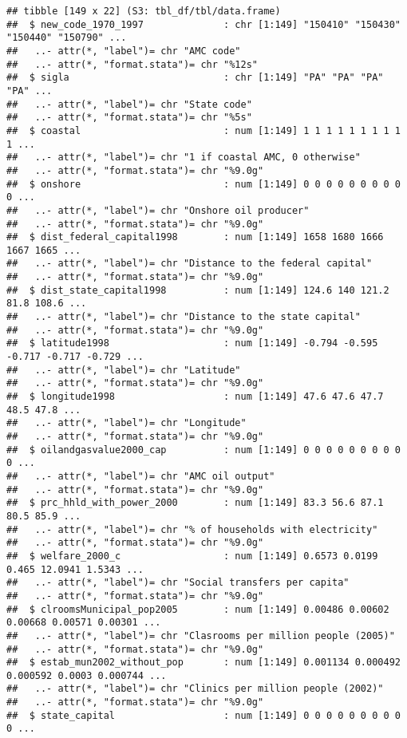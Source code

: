 \documentclass[
]{article}
\begin{document}
\begin{verbatim}
## tibble [149 x 22] (S3: tbl_df/tbl/data.frame)
##  $ new_code_1970_1997              : chr [1:149] "150410" "150430" "150440" "150790" ...
##   ..- attr(*, "label")= chr "AMC code"
##   ..- attr(*, "format.stata")= chr "%12s"
##  $ sigla                           : chr [1:149] "PA" "PA" "PA" "PA" ...
##   ..- attr(*, "label")= chr "State code"
##   ..- attr(*, "format.stata")= chr "%5s"
##  $ coastal                         : num [1:149] 1 1 1 1 1 1 1 1 1 1 ...
##   ..- attr(*, "label")= chr "1 if coastal AMC, 0 otherwise"
##   ..- attr(*, "format.stata")= chr "%9.0g"
##  $ onshore                         : num [1:149] 0 0 0 0 0 0 0 0 0 0 ...
##   ..- attr(*, "label")= chr "Onshore oil producer"
##   ..- attr(*, "format.stata")= chr "%9.0g"
##  $ dist_federal_capital1998        : num [1:149] 1658 1680 1666 1667 1665 ...
##   ..- attr(*, "label")= chr "Distance to the federal capital"
##   ..- attr(*, "format.stata")= chr "%9.0g"
##  $ dist_state_capital1998          : num [1:149] 124.6 140 121.2 81.8 108.6 ...
##   ..- attr(*, "label")= chr "Distance to the state capital"
##   ..- attr(*, "format.stata")= chr "%9.0g"
##  $ latitude1998                    : num [1:149] -0.794 -0.595 -0.717 -0.717 -0.729 ...
##   ..- attr(*, "label")= chr "Latitude"
##   ..- attr(*, "format.stata")= chr "%9.0g"
##  $ longitude1998                   : num [1:149] 47.6 47.6 47.7 48.5 47.8 ...
##   ..- attr(*, "label")= chr "Longitude"
##   ..- attr(*, "format.stata")= chr "%9.0g"
##  $ oilandgasvalue2000_cap          : num [1:149] 0 0 0 0 0 0 0 0 0 0 ...
##   ..- attr(*, "label")= chr "AMC oil output"
##   ..- attr(*, "format.stata")= chr "%9.0g"
##  $ prc_hhld_with_power_2000        : num [1:149] 83.3 56.6 87.1 80.5 85.9 ...
##   ..- attr(*, "label")= chr "% of households with electricity"
##   ..- attr(*, "format.stata")= chr "%9.0g"
##  $ welfare_2000_c                  : num [1:149] 0.6573 0.0199 0.465 12.0941 1.5343 ...
##   ..- attr(*, "label")= chr "Social transfers per capita"
##   ..- attr(*, "format.stata")= chr "%9.0g"
##  $ clroomsMunicipal_pop2005        : num [1:149] 0.00486 0.00602 0.00668 0.00571 0.00301 ...
##   ..- attr(*, "label")= chr "Clasrooms per million people (2005)"
##   ..- attr(*, "format.stata")= chr "%9.0g"
##  $ estab_mun2002_without_pop       : num [1:149] 0.001134 0.000492 0.000592 0.0003 0.000744 ...
##   ..- attr(*, "label")= chr "Clinics per million people (2002)"
##   ..- attr(*, "format.stata")= chr "%9.0g"
##  $ state_capital                   : num [1:149] 0 0 0 0 0 0 0 0 0 0 ...

\end{verbatim}
\end{document}
